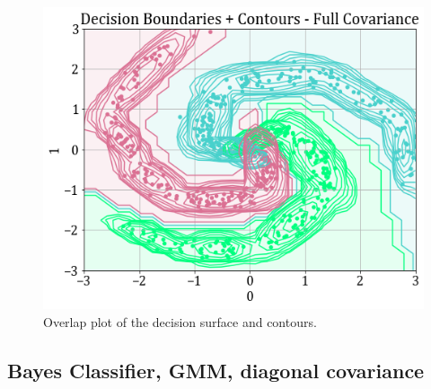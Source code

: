 \documentclass[11pt,a4paper]{article}
\begin{document}
\begin{figure}[H]
    \centering
    \includegraphics[scale=0.45]{images/1b_full_ds_contours.png}
    \caption{Overlap plot of the decision surface and contours.}
\end{figure}

\subsection{Bayes Classifier, GMM, diagonal covariance}
\end{document}
